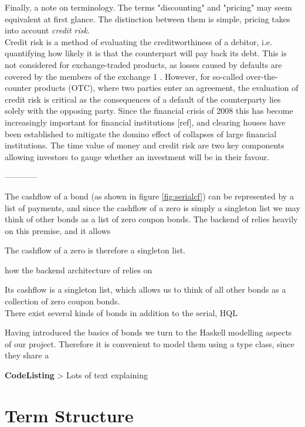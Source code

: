 Finally, a note on terminology. The terms "discounting" and "pricing" 
may seem equivalent at first glance. The distinction between them is simple, 
pricing takes into account \emph{credit risk}. \\

Credit risk is a method of evaluating the creditworthiness of a debitor, i.e. 
quantifying
how likely it is that the counterpart will pay back its debt. This is not 
considered for
exchange-traded products, as losses caused by defaults are covered by the 
members of the exchange 1 . However, for so-called over-the-counter products 
(OTC), where two parties enter an agreement, the evaluation of credit risk is 
critical as the consequences of a default of the counterparty lies solely with 
the opposing party. Since the financial crisis of 2008 this has become 
increasingly important for financial institutions [ref], and clearing houses 
have been established to mitigate the domino effect of collapses of large 
financial institutions. The time value of money and credit risk are two key 
components allowing investors to gauge whether an investment will be in their 
favour.

------------

The cashflow of a bond (as shown in figure \ref{fig:serialcf}) can be 
represented by a list of payments, and since the cashflow of a zero is simply
a singleton list we may think of other bonds as a list of zero coupon bonds.
The backend of \hql relies heavily on this premise, and it allows 

The cashflow of a zero is therefore a singleton list.

how the backend
architecture of \hql relies on

Its cashflow is a singleton list, which allows us to think of all other bonds
as a collection of zero coupon bonds.\\

There exist several kinds of bonds in addition to the serial, \textsc{HQL}

Having introduced the basics of bonds we turn to the Haskell modelling aspects 
of our project. Therefore it is convenient to model them using a type class, since they share a 

\textbf{CodeListing}
> Lots of text explaining



\section{Term Structure}

